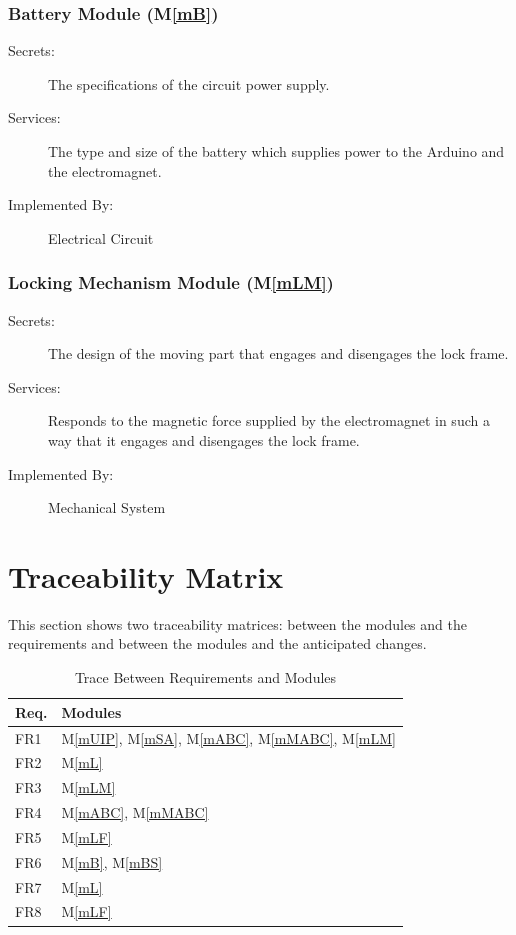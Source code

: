 \documentclass[12pt, titlepage]{article}
\newcommand{\mref}[1]{M\ref{#1}}
\begin{document}
\subsubsection{Battery Module (\mref{mB})}
\begin{description}
\item[Secrets:]The specifications of the circuit power supply.
\item[Services:]The type and size of the battery which supplies power to the Arduino and the electromagnet. 
\item[Implemented By:]Electrical Circuit
\end{description}


\subsubsection{Locking Mechanism Module (\mref{mLM})}
\begin{description}
\item[Secrets:]The design of the moving part that engages and disengages the lock frame.
\item[Services:]Responds to the magnetic force supplied by the electromagnet in such a way that it engages and disengages the lock frame.
\item[Implemented By:]Mechanical System
\end{description}

\section{Traceability Matrix} \label{SecTM}

This section shows two traceability matrices: between the modules and the
requirements and between the modules and the anticipated changes.

\begin{table}[H]
\centering
\begin{tabular}{p{} p{}}
\toprule
\textbf{Req.} & \textbf{Modules}\\
\midrule
FR1 & \mref{mUIP}, \mref{mSA}, \mref{mABC}, \mref{mMABC}, \mref{mLM}\\
FR2 & \mref{mL}\\
FR3 & \mref{mLM}\\
FR4 & \mref{mABC}, \mref{mMABC}\\
FR5 & \mref{mLF}\\
FR6 & \mref{mB}, \mref{mBS}\\
FR7 & \mref{mL}\\
FR8 & \mref{mLF}\\
\bottomrule
\end{tabular}
\caption{Trace Between Requirements and Modules}
\label{TblRT}
\end{table}
\end{document}
